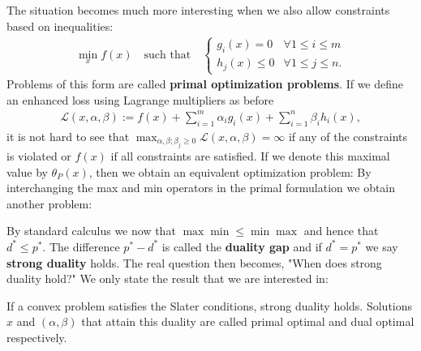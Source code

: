 {    The situation becomes much more interesting when we also allow constraints based on inequalities:
    \begin{gather}
        \label{data:constrained_optimization}
        \min_x f(x)\quad\text{such that}\quad
        \begin{cases}
            g_i(x)=0&\forall 1\leq i\leq m\\
            h_j(x)\leq0&\forall 1\leq j\leq n.
        \end{cases}
    \end{gather}
    Problems of this form are called \textbf{primal optimization problems}. If we define an enhanced loss using Lagrange multipliers as before
    \begin{gather}
        \mathcal{L}(x,\alpha,\beta) := f(x) + \sum_{i=1}^m\alpha_ig_i(x) + \sum_{i=1}^n\beta_ih_i(x),
    \end{gather}
    it is not hard to see that $\displaystyle\max_{\alpha,\beta;\beta_j\geq0}\mathcal{L}(x,\alpha,\beta) = \infty$ if any of the constraints is violated or $f(x)$ if all constraints are satisfied. If we denote this maximal value by $\theta_P(x)$, then we obtain an equivalent optimization problem:
    By interchanging the max and min operators in the primal formulation we obtain another problem:

    By standard calculus we now that $\max\min\leq\min\max$ and hence that $d^*\leq p^*$. The difference $p^*-d^*$ is called the \textbf{duality gap} and if $d^*=p^*$ we say \textbf{strong duality} holds. The real question then becomes, "When does strong duality hold?" We only state the result that we are interested in:
    \begin{property}
        If a convex problem satisfies the Slater conditions, strong duality holds. Solutions $x$ and $(\alpha,\beta)$ that attain this duality are called primal optimal and dual optimal respectively.
    \end{property}

}

